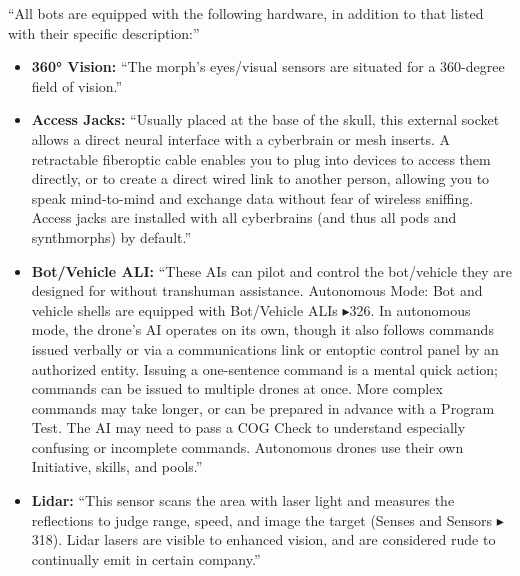 “All bots are equipped with the following hardware, in addition to that listed with their specific description:”

\begin{itemize}
    \item \textbf{360° Vision:} “The morph’s eyes/visual sensors are situated for a 360-degree field of vision.” \citep[pg. 318]{ep2e_1.1_2019}

    \item \textbf{Access Jacks:} “Usually placed at the base of the skull, this external socket allows a direct neural interface with a cyberbrain or mesh inserts. A retractable fiberoptic cable enables you to plug into devices to access them directly, or to create a direct wired link to another person, allowing you to speak mind-to-mind and exchange data without fear of wireless sniffing. Access jacks are installed with all cyberbrains (and thus all pods and synthmorphs) by default.” \citep[pg. 318]{ep2e_1.1_2019}

    \item \textbf{Bot/Vehicle ALI:} “These AIs can pilot and control the bot/vehicle they are designed for without transhuman assistance. Autonomous Mode: Bot and vehicle shells are equipped with Bot/Vehicle ALIs $\blacktriangleright$326. In autonomous mode, the drone’s AI operates on its own, though it also follows commands issued verbally or via a communications link or entoptic control panel by an authorized entity. Issuing a one-sentence command is a mental quick action; commands can be issued to multiple drones at once. More complex commands may take longer, or can be prepared in advance with a Program Test. The AI may need to pass a COG Check to understand especially confusing or incomplete commands. Autonomous drones use their own Initiative, skills, and pools.” \citep[pg. 326, 346]{ep2e_1.1_2019}

    \item \textbf{Lidar:} “This sensor scans the area with laser light and measures the reflections to judge range, speed, and image the target (Senses and Sensors $\blacktriangleright$318). Lidar lasers are visible to enhanced vision, and are considered rude to continually emit in certain company.” \citep[pg. 318]{ep2e_1.1_2019}


\end{itemize}
